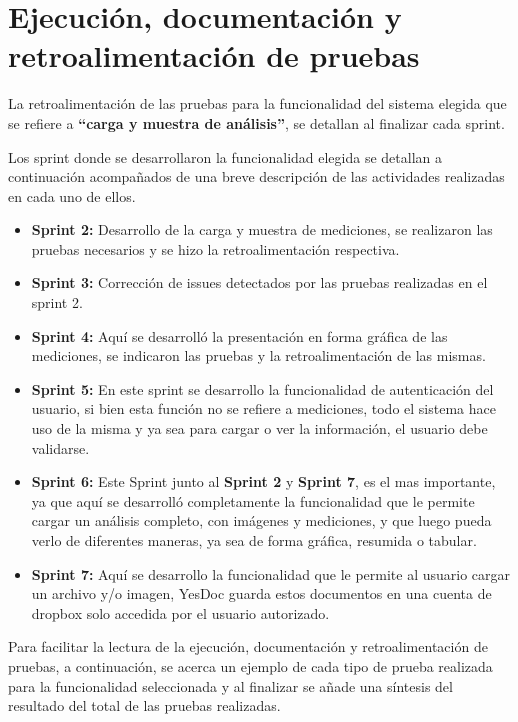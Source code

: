 \section{Ejecución, documentación y retroalimentación de pruebas}
 La retroalimentación de las pruebas para la funcionalidad del sistema elegida que se refiere a \textbf{``carga y muestra de análisis''}, se detallan al finalizar cada sprint.
 
  Los sprint donde se desarrollaron la funcionalidad elegida se detallan a continuación acompañados de una breve descripción de las actividades realizadas en cada uno de ellos.
 \begin{itemize}
 	\item \textbf{Sprint 2:} Desarrollo de la carga y muestra de mediciones, se realizaron las pruebas necesarios y se hizo la retroalimentación respectiva.
 	\item \textbf{Sprint 3:} Corrección de issues detectados por las pruebas realizadas en el sprint 2.
 	\item \textbf{Sprint 4:} Aquí se desarrolló la presentación en forma gráfica de las mediciones, se indicaron las pruebas y la retroalimentación de las mismas.
 	\item \textbf{Sprint 5:} En este sprint se desarrollo la funcionalidad de autenticación del usuario, si bien esta función no se refiere a mediciones, todo el sistema hace uso de la misma y ya sea para cargar o ver la información, el usuario debe validarse.
 	\item \textbf{Sprint 6: } Este Sprint junto al \textbf{Sprint 2} y \textbf{Sprint 7}, es el mas importante, ya que aquí se desarrolló completamente la funcionalidad que le permite cargar un análisis completo, con imágenes y mediciones,  y que luego pueda verlo de diferentes maneras, ya sea de forma gráfica, resumida o tabular.
 	\item \textbf{Sprint 7: } Aquí se desarrollo la funcionalidad que le permite al usuario cargar un archivo y/o imagen, YesDoc guarda estos documentos en una cuenta de dropbox solo accedida por el usuario autorizado.
 \end{itemize}
 

 Para facilitar la lectura de la ejecución, documentación y retroalimentación de pruebas, a continuación, se acerca un ejemplo de cada tipo de prueba realizada para la funcionalidad seleccionada y al finalizar se añade  una síntesis del resultado del total de las pruebas realizadas.

